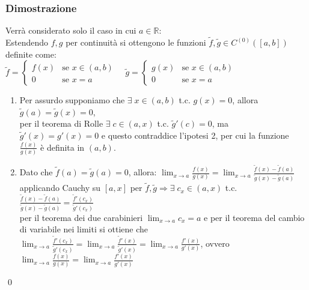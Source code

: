 \documentclass[a4paper]{article}
\newcommand\cont[2]{C^{(#1)} \left({#2}\right)}
\begin{document}
\subsubsection*{Dimostrazione}
Verrà considerato solo il caso in cui \(a \in \mathbb{R}\): \\
Estendendo \(f, g\) per continuità si ottengono le funzioni \(\widetilde{f}, \widetilde{g} \in \cont{0}{\left[a, b\right]}\) definite come: \\
\(\displaystyle \widetilde{f} = \begin{cases}
	f(x) &\text{se } x \in \left(a, b\right) \\
	0 &\text{se } x = a
\end{cases}
\quad \widetilde{g} = \begin{cases}
	g(x) &\text{se } x \in \left(a, b\right) \\
	0 &\text{se } x = a
\end{cases}\)
\begin{enumerate}
	\item Per assurdo supponiamo che \(\exists \; x \in \left(a, b\right)\) t.c. \(g(x) = 0\), allora \(\widetilde{g}(a) = \widetilde{g}(x) = 0\), \\
	per il teorema di Rolle \(\exists \; c \in \left(a, x\right)\) t.c. \(\widetilde{g}'(c) = 0\), ma \(\widetilde{g}'(x) = g'(x) = 0\)
	e questo contraddice l'ipotesi 2, per cui la funzione \(\displaystyle \frac{f(x)}{g(x)}\) è definita in \(\left(a, b\right)\).
	\item Dato che \(\widetilde{f}(a) = \widetilde{g}(a) = 0\), allora: 
	\(\displaystyle \lim_{x \to a} \frac{f(x)}{g(x)} = \lim_{x \to a} \frac{\widetilde{f}(x)-\widetilde{f}(a)}{\widetilde{g}(x)-\widetilde{g}(a)}\) \\
	applicando Cauchy su \(\left[a, x\right]\) per \(\widetilde{f}, \widetilde{g} \Rightarrow \exists \; c_x \in \left(a, x\right)\) t.c.
	\(\displaystyle \frac{\widetilde{f}(x)-\widetilde{f}(a)}{\widetilde{g}(x)-\widetilde{g}(a)} = \frac{\widetilde{f}'(c_x)}{\widetilde{g}'(c_x)}\) \\
	per il teorema dei due carabinieri \(\displaystyle \lim_{x \to a} c_x = a\) e per il teorema del cambio di variabile nei limiti si ottiene che 
	\(\displaystyle \lim_{x \to a} \frac{\widetilde{f}'(c_x)}{\widetilde{g}'(c_x)} = \lim_{x \to a} \frac{\widetilde{f}'(x)}{\widetilde{g}'(x)} = \lim_{x \to a} \frac{f'(x)}{g'(x)}\),
	ovvero \(\displaystyle \lim_{x \to a} \frac{f(x)}{g(x)} = \lim_{x \to a} \frac{f'(x)}{g'(x)}\) 
\end{enumerate}
\qed
\end{document}
